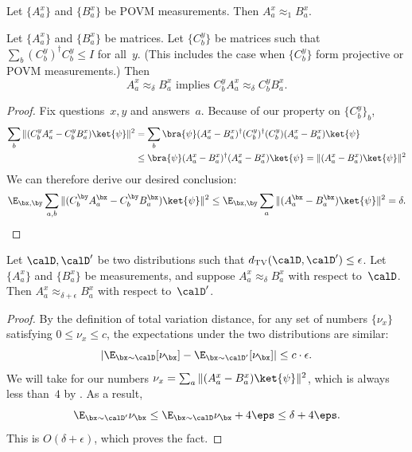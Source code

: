 \begin{fact}\label{fact:trivial-upper-bound-approx-delta}
Let $\{A^x_a\}$ and $\{B^x_a\}$ be POVM measurements.
Then $A^x_a \approx_1 B^x_a$.
\end{fact}

\begin{fact}\label{fact:add-a-proj}
Let $\{A_a^{x}\}$ and $\{B_a^{x}\}$ be matrices.
Let $\{C_b^{y}\}$ be matrices such that $\sum_b (C_b^y)^\dagger C_b^y \leq I$ for all~$y$.
(This includes the case when $\{C_b^y\}$ form projective or POVM measurements.) Then
\begin{equation*}
\text{$A_a^{x} \approx_{\delta} B_a^x$ implies $C_b^y A_a^x \approx_{\delta} C_b^y B_a^x$.}
\end{equation*}
\end{fact}
\begin{proof}
Fix questions~$x, y$ and answers~$a$. Because of our property on $\{C_b^y\}_b$,
\begin{align*}
\sum_{b} \Vert (C_b^{y} A_a^{x} - C_b^{y} B_a^{x})\ket{\psi}\Vert^2
&= \sum_{b} \bra{\psi} (A_a^x - B_a^x)^\dagger (C_b^y)^\dagger (C_b^y) (A_a^{x} -  B_a^{x})\ket{\psi}\\
&\leq \bra{\psi} (A_a^x - B_a^x)^\dagger (A_a^x - B_a^x) \ket{\psi}
 = \Vert (A_a^{x} -B_a^{x})\ket{\psi}\Vert^2
\end{align*}
We can therefore derive our desired conclusion:
\begin{equation*}
\E_{\bx, \by} \sum_{a, b} \Vert (C_b^{\by} A_a^{\bx} - C_b^{\by} B_a^{\bx}) \ket{\psi} \Vert^2
\leq \E_{\bx, \by} \sum_{a} \Vert (A_a^{\bx} - B_a^{\bx}) \ket{\psi} \Vert^2
= \delta.\qedhere
\end{equation*}
\end{proof}

\begin{fact}\label{fact:swap-dists}
Let $\calD, \calD'$ be two distributions such that $d_{\mathrm{TV}}(\calD, \calD') \leq \epsilon$.
Let $\{A_a^x\}$ and $\{B_a^x\}$ be measurements,
and suppose $A_a^x \approx_\delta B_a^x$ with respect to~$\calD$. Then $A_a^x \approx_{\delta + \epsilon} B_a^x$ with respect to~$\calD'$.
\end{fact}
\begin{proof}
By the definition of total variation distance,
for any set of numbers $\{\nu_x\}$ satisfying $0 \leq \nu_x \leq c$,
the expectations under the two distributions are similar:
\begin{equation*}
|\E_{\bx \sim \calD} [\nu_\bx] - \E_{\bx \sim \calD'}[\nu_{\bx}]| \leq c \cdot \epsilon.
\end{equation*}
We will take for our numbers $\nu_x = \sum_a \Vert (A_{a}^{x} - B_{a}^{x} ) \ket{\psi}\Vert^2$,
which is always less than~$4$ by .
As a result,
\begin{equation*}
\E_{\bx \sim \calD'} \nu_{\bx} \leq \E_{\bx \sim \calD} \nu_{\bx} + 4 \eps \leq \delta + 4 \eps.
\end{equation*}
This is $O(\delta + \epsilon)$, which proves the fact.
\end{proof}

